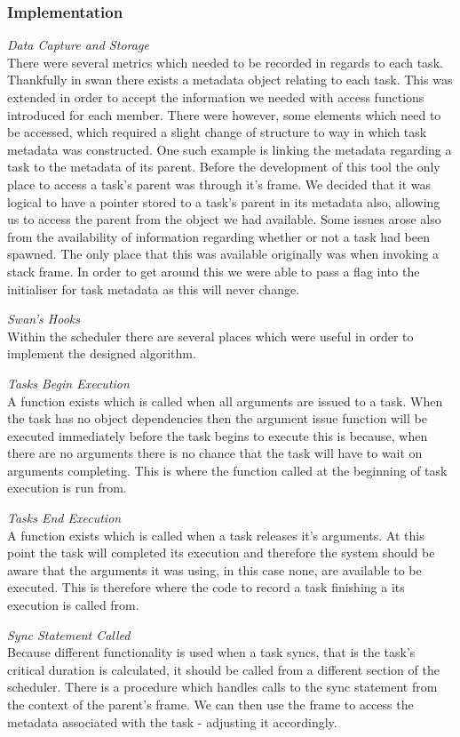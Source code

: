 \subsubsection{Implementation}
\emph{Data Capture and Storage}\\
There were several metrics which needed to be recorded in regards to each task. Thankfully in swan there exists a metadata object relating to each task. This was extended in order to accept the information we needed with access functions introduced for each member. There were however, some elements which need to be accessed, which required a slight change of structure to way in which task metadata was constructed. One such example is linking the metadata regarding a task to the metadata of its parent. Before the development of this tool the only place to access a task's parent was through it's frame. We decided that it was logical to have a pointer stored to a task's parent in its metadata also, allowing us to access the parent from the object we had available. Some issues arose also from the availability of information regarding whether or not a task had been spawned. The only place that this was available originally was when invoking a stack frame. In order to get around this we were able to pass a flag into the initialiser for task metadata as this will never change.

\emph{Swan's Hooks}\\
Within the scheduler there are several places which were useful in order to implement the designed algorithm.

\emph{Tasks Begin Execution}\\
A function exists which is called when all arguments are issued to a task. When the task has no object dependencies then the argument issue function will be executed immediately before the task begins to execute this is because, when there are no arguments there is no chance that the task will have to wait on arguments completing. This is where the function called at the beginning of task execution is run from.

\emph{Tasks End Execution}\\
A function exists which is called when a task releases it's arguments. At this point the task will completed its execution and therefore the system should be aware that the arguments it was using, in this case none, are available to be executed. This is therefore where the code to record a task finishing a its execution is called from.

\emph{Sync Statement Called}\\
Because different functionality is used when a task syncs, that is the task's critical duration is calculated, it should be called from a different section of the scheduler. There is a procedure which handles calls to the sync statement from the context of the parent's frame. We can then use the frame to access the metadata associated with the task - adjusting it accordingly.

